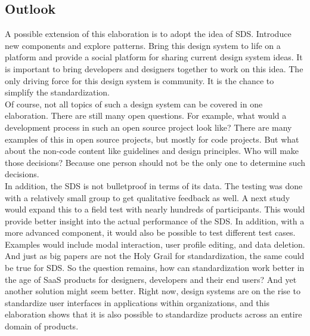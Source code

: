\subsection{Outlook}
A possible extension of this elaboration is to adopt the idea of \ac{SDS}. Introduce new components and explore patterns. Bring this design system to life on a platform and provide a social platform for sharing current design system ideas. It is important to bring developers and designers together to work on this idea. The only driving force for this design system is community. It is the chance to simplify the standardization. \\
Of course, not all topics of such a design system can be covered in one elaboration. There are still many open questions. For example, what would a development process in such an open source project look like? There are many examples of this in open source projects, but mostly for code projects. But what about the non-code content like guidelines and design principles. Who will make those decisions? Because one person should not be the only one to determine such decisions. \\
In addition, the \ac{SDS} is not bulletproof in terms of its data. The testing was done with a relatively small group to get qualitative feedback as well. A next study would expand this to a field test with nearly hundreds of participants. This would provide better insight into the actual performance of the \ac{SDS}. In addition, with a more advanced component, it would also be possible to test different test cases. Examples would include modal interaction, user profile editing, and data deletion. \\
And just as big papers are not the Holy Grail for standardization, the same could be true for \ac{SDS}. So the question remains, how can standardization work better in the age of SaaS products for designers, developers and their end users? And yet another solution might seem better. Right now, design systems are on the rise to standardize user interfaces in applications within organizations, and this elaboration shows that it is also possible to standardize products across an entire domain of products. 